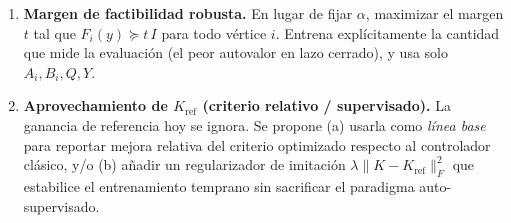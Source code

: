 {\begin{enumerate}
    \item \textbf{Margen de factibilidad robusta.} En lugar de fijar $\alpha$, maximizar el margen $t$ tal que $F_i(y) \succeq t\,I$ para todo vértice $i$. Entrena explícitamente la cantidad que mide la evaluación (el peor autovalor en lazo cerrado), y usa solo $A_i, B_i, Q, Y$.

    \item \textbf{Aprovechamiento de $K_\text{ref}$ (criterio relativo / supervisado).} La ganancia de referencia hoy se ignora. Se propone (a) usarla como \emph{línea base} para reportar mejora relativa del criterio optimizado respecto al controlador clásico, y/o (b) añadir un regularizador de imitación $\lambda \lVert K - K_\text{ref} \rVert_F^2$ que estabilice el entrenamiento temprano sin sacrificar el paradigma auto-supervisado.
\end{enumerate}
}
